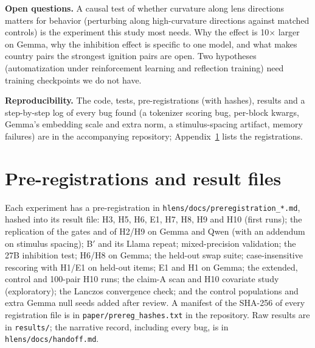 \documentclass[10pt]{article}
\begin{document}
\textbf{Open questions.} A causal test of whether curvature along lens directions matters for behavior (perturbing along high-curvature directions against matched controls) is the experiment this study most needs. Why the effect is 10$\times$ larger on Gemma, why the inhibition effect is specific to one model, and what makes country pairs the strongest ignition pairs are open. Two hypotheses (automatization under reinforcement learning and reflection training) need training checkpoints we do not have.

\textbf{Reproducibility.} The code, tests, pre-registrations (with hashes), results and a step-by-step log of every bug found (a tokenizer scoring bug, per-block kwargs, Gemma's embedding scale and extra norm, a stimulus-spacing artifact, memory failures) are in the accompanying repository; Appendix~\ref{app:prereg} lists the registrations.




\appendix
\section{Pre-registrations and result files}
\label{app:prereg}
\small
Each experiment has a pre-registration in \texttt{hlens/docs/preregistration\_*.md}, hashed into its result file: H3, H5, H6, E1, H7, H8, H9 and H10 (first runs); the replication of the gates and of H2/H9 on Gemma and Qwen (with an addendum on stimulus spacing); B$'$ and its Llama repeat; mixed-precision validation; the 27B inhibition test; H6/H8 on Gemma; the held-out swap suite; case-insensitive rescoring with H1/E1 on held-out items; E1 and H1 on Gemma; the extended, control and 100-pair H10 runs; the claim-A scan and H10 covariate study (exploratory); the Lanczos convergence check; and the control populations and extra Gemma null seeds added after review. A manifest of the SHA-256 of every registration file is in \texttt{paper/prereg\_hashes.txt} in the repository. Raw results are in \texttt{results/}; the narrative record, including every bug, is in \texttt{hlens/docs/handoff.md}.
\end{document}
